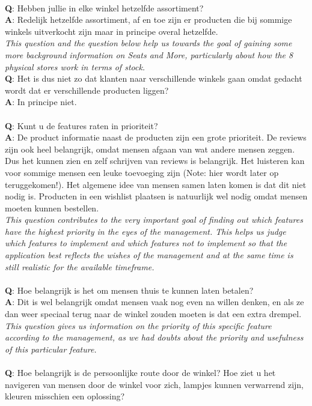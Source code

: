 \documentclass[a4paper]{article}
\begin{document}
\\
\textbf{Q}: Hebben jullie in elke winkel hetzelfde assortiment?\\
\textbf{A}: Redelijk hetzelfde assortiment, af en toe zijn er producten die bij sommige winkels uitverkocht zijn maar in principe overal hetzelfde.\\
\textit{This question and the question below help us towards the goal of gaining some more background information on Seats and More, particularly about how the 8 physical stores work in terms of stock.}
\\
\textbf{Q}: Het is dus niet zo dat klanten naar verschillende winkels gaan omdat gedacht wordt dat er verschillende producten liggen?\\
\textbf{A}: In principe niet.\\
\\
\textbf{Q}: Kunt u de features raten in prioriteit?\\
\textbf{A}: De product informatie naast de producten zijn een grote prioriteit. De reviews zijn ook heel belangrijk, omdat mensen afgaan van wat andere mensen zeggen. Dus het kunnen zien en zelf schrijven van reviews is belangrijk. Het luisteren kan voor sommige mensen een leuke toevoeging zijn (Note: hier wordt later op teruggekomen!). Het algemene idee van mensen samen laten komen is dat dit niet nodig is. Producten in een wishlist plaatsen is natuurlijk wel nodig omdat mensen moeten kunnen bestellen. \\
\textit{This question contributes to the very important goal of finding out which features have the highest priority in the eyes of the management. This helps us judge which features to implement and which features not to implement so that the application best reflects the wishes of the management and at the same time is still realistic for the available timeframe.}\\
\\
\textbf{Q}: Hoe belangrijk is het om mensen thuis te kunnen laten betalen?\\
\textbf{A}: Dit is wel belangrijk omdat mensen vaak nog even na willen denken, en als ze dan weer speciaal terug naar de winkel zouden moeten is dat een extra drempel.\\
\textit{This question gives us information on the priority of this specific feature according to the management, as we had doubts about the priority and usefulness of this particular feature. }\\
\\
\textbf{Q}: Hoe belangrijk is de persoonlijke route door de winkel? Hoe ziet u het navigeren van mensen door de winkel voor zich, lampjes kunnen verwarrend zijn, kleuren misschien een oplossing?\\
\end{document}

